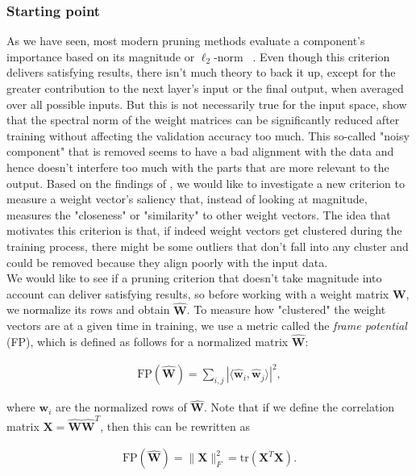 \subsubsection*{Starting point}
As we have seen, most modern pruning methods evaluate a component's importance based on its magnitude or $\ell_2$-norm ~\autocite{li2016pruning}. Even though this criterion delivers satisfying results, there isn't much theory to back it up, except for the greater contribution to the next layer's input or the final output, when averaged over all possible inputs. But this is not necessarily true for the input space, \cite{nagarajan2019uniform} show that the spectral norm of the weight matrices can be significantly reduced after training without affecting the validation accuracy too much. This so-called "noisy component" that is removed seems to have a bad alignment with the data and hence doesn't interfere too much with the parts that are more relevant to the output. Based on the findings of \cite{brutzkus2019larger}, we would like to investigate a new criterion to measure a weight vector's saliency that, instead of looking at magnitude, measures the "closeness" or "similarity" to other weight vectors. The idea that motivates this criterion is that, if indeed weight vectors get clustered during the training process, there might be some outliers that don't fall into any cluster and could be removed because they align poorly with the input data. \\

We would like to see if a pruning criterion that doesn't take magnitude into account can deliver satisfying results, so before working with a weight matrix $\mathbf{W}$, we normalize its rows and obtain $\hat{\mathbf{W}}$. To measure how "clustered" the weight vectors are at a given time in training, we use a metric called the \textit{frame potential} (FP), which is defined as follows for a normalized matrix $\hat{\mathbf{W}}$:

\begin{align*}
\text{FP}(\hat{\mathbf{W}}) = \sum\limits_{i,j} |\langle \hat{\mathbf{w}}_i, \hat{\mathbf{w}}_j \rangle|^2,
\end{align*}

where $\mathbf{w}_i$ are the normalized rows of $\hat{\mathbf{W}}$. Note that if we define the correlation matrix $\mathbf{X} =  \hat{\mathbf{W}}\hat{\mathbf{W}}^T$, then this can be rewritten as

\begin{align*}
\text{FP}(\hat{\mathbf{W}}) = \|\mathbf{X}\|_F^2 = \text{tr}(\mathbf{X}^T\mathbf{X}).
\end{align*}

